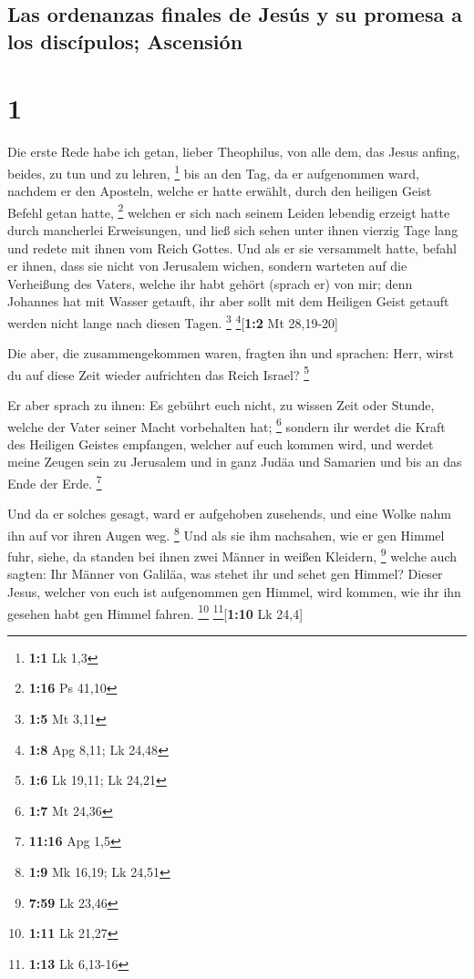 \hypertarget{las-ordenanzas-finales-de-jesuxfas-y-su-promesa-a-los-discuxedpulos-ascensiuxf3n}{%
\subsection{Las ordenanzas finales de Jesús y su promesa a los
discípulos;
Ascensión}\label{las-ordenanzas-finales-de-jesuxfas-y-su-promesa-a-los-discuxedpulos-ascensiuxf3n}}

\hypertarget{section}{%
\section{1}\label{section}}

 Die erste Rede habe ich getan, lieber Theophilus, von
alle dem, das Jesus anfing, beides, zu tun und zu lehren, \footnote{\textbf{1:1}
  Lk 1,3}  bis an den Tag, da er aufgenommen ward, nachdem
er den Aposteln, welche er hatte erwählt, durch den heiligen Geist
Befehl getan hatte, \footnote{\textbf{1:16} Ps 41,10} 
welchen er sich nach seinem Leiden lebendig erzeigt hatte durch
mancherlei Erweisungen, und ließ sich sehen unter ihnen vierzig Tage
lang und redete mit ihnen vom Reich Gottes.  Und als er
sie versammelt hatte, befahl er ihnen, dass sie nicht von Jerusalem
wichen, sondern warteten auf die Verheißung des Vaters, welche ihr habt
gehört (sprach er) von mir;  denn Johannes hat mit Wasser
getauft, ihr aber sollt mit dem Heiligen Geist getauft werden nicht
lange nach diesen Tagen. \footnote{\textbf{1:5} Mt 3,11}
\footnote{\textbf{1:8} Apg 8,11; Lk 24,48}{[}\textbf{1:2} Mt 28,19-20{]}

 Die aber, die zusammengekommen waren, fragten ihn und
sprachen: Herr, wirst du auf diese Zeit wieder aufrichten das Reich
Israel? \footnote{\textbf{1:6} Lk 19,11; Lk 24,21}

 Er aber sprach zu ihnen: Es gebührt euch nicht, zu wissen
Zeit oder Stunde, welche der Vater seiner Macht vorbehalten hat;
\footnote{\textbf{1:7} Mt 24,36}  sondern ihr werdet die
Kraft des Heiligen Geistes empfangen, welcher auf euch kommen wird, und
werdet meine Zeugen sein zu Jerusalem und in ganz Judäa und Samarien und
bis an das Ende der Erde. \footnote{\textbf{11:16} Apg 1,5}

 Und da er solches gesagt, ward er aufgehoben zusehends,
und eine Wolke nahm ihn auf vor ihren Augen weg. \footnote{\textbf{1:9}
  Mk 16,19; Lk 24,51}  Und als sie ihm nachsahen, wie er
gen Himmel fuhr, siehe, da standen bei ihnen zwei Männer in weißen
Kleidern, \footnote{\textbf{7:59} Lk 23,46}  welche auch
sagten: Ihr Männer von Galiläa, was stehet ihr und sehet gen Himmel?
Dieser Jesus, welcher von euch ist aufgenommen gen Himmel, wird kommen,
wie ihr ihn gesehen habt gen Himmel fahren. \footnote{\textbf{1:11} Lk
  21,27} \footnote{\textbf{1:13} Lk 6,13-16}{[}\textbf{1:10} Lk 24,4{]}

